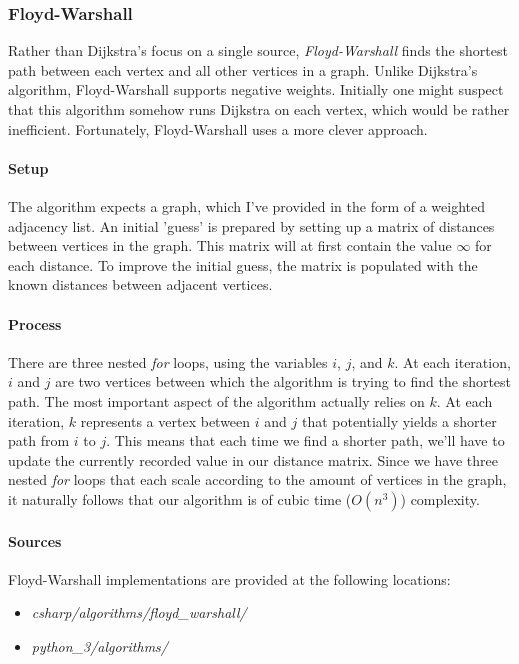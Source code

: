 \documentclass{article}
\begin{document}
\subsubsection{Floyd-Warshall}
Rather than Dijkstra's focus on a single source, {\em Floyd-Warshall} finds the shortest path between each vertex
and all other vertices in a graph. Unlike Dijkstra's algorithm, Floyd-Warshall supports negative weights.
Initially one might suspect that this algorithm somehow runs Dijkstra on each vertex, which would be rather
inefficient. Fortunately, Floyd-Warshall uses a more clever approach.

\paragraph{Setup}
The algorithm expects a graph, which I've provided in the form of a weighted adjacency list. An initial 'guess' is
prepared by setting up a matrix of distances between vertices in the graph. This matrix will at first contain the
value \(\infty\) for each distance. To improve the initial guess, the matrix is populated with the known distances
between adjacent vertices.

\paragraph{Process}
There are three nested {\em for} loops, using the variables \(i\), \(j\), and \(k\). At each iteration,
\(i\) and \(j\) are two vertices between which the algorithm is trying to find the shortest path. The most important
aspect of the algorithm actually relies on \(k\). At each iteration, \(k\) represents a vertex between \(i\) and
\(j\) that potentially yields a shorter path from \(i\) to \(j\). This means that each time we find a shorter path,
we'll have to update the currently recorded value in our distance matrix. Since we have three nested {\em for} loops
that each scale according to the amount of vertices in the graph, it naturally follows that our algorithm is of
cubic time (\(O(n^3)\)) complexity.

\paragraph{Sources}
Floyd-Warshall implementations are provided at the following locations:
\begin{itemize}
\item{{\em csharp/algorithms/floyd\_warshall/}}
\item{{\em python\_3/algorithms/}}
\end{itemize}
\end{document}
